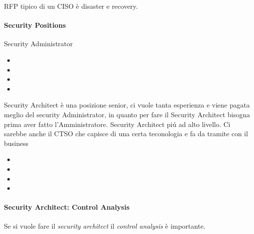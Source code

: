 RFP tipico di un CISO è disaster e recovery. 




\paragraph{Security Positions} 
Security Administrator

\begin{itemize}
\item 
\item 
\item
\item 
\end{itemize}
Security Architect è una posizione senior, ci vuole tanta esperienza e viene 
pagata meglio del security Administrator, in quanto per fare il Security 
Architect bisogna prima aver fatto l'Amministratore. 
Security Architect piú ad alto livello. Ci sarebbe anche il CTSO che capisce di 
una certa teconologia e fa da tramite con il business
\begin{itemize}
\item 
\item 
\item
\item 
\end{itemize}
\paragraph{Security Architect: Control Analysis}

Se si vuole fare il \textit{security architect} il \textit{control analysis} è 
importante.

